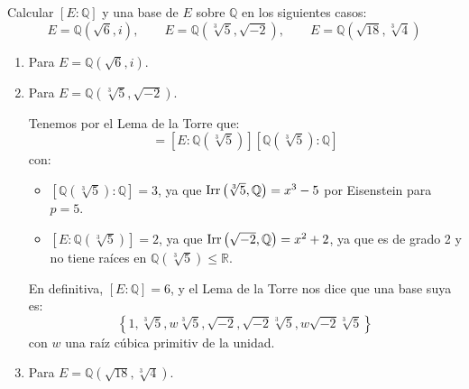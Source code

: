 \begin{ejercicio}
    Calcular $[E:\mathbb{Q}]$ y una base de $E$ sobre $\mathbb{Q}$ en los siguientes casos:
    \begin{equation*}
        E = \mathbb{Q}\left(\sqrt{6},i\right), \qquad E= \mathbb{Q}\left(\sqrt[3]{5},\sqrt{-2}\right), \qquad E = \mathbb{Q}\left(\sqrt{18},\sqrt[3]{4}\right)
    \end{equation*}
    \begin{enumerate}[label=\alph*)]
        \item Para $E = \mathbb{Q}\left(\sqrt{6},i\right)$. %
        \item Para $E= \mathbb{Q}\left(\sqrt[3]{5},\sqrt{-2}\right)$.

            Tenemos por el Lema de la Torre que:
            \begin{equation*}
                [E:\mathbb{Q}] = \left[E:\mathbb{Q}\left(\sqrt[3]{5}\right)\right]\left[\mathbb{Q}\left(\sqrt[3]{5}\right):\mathbb{Q}\right]
            \end{equation*}
            con:
            \begin{itemize}
                \item $\left[\mathbb{Q}\left(\sqrt[3]{5}\right):\mathbb{Q}\right] = 3$, ya que $\operatorname{Irr}\left(\sqrt[3]{5},\mathbb{Q}\right) = x^3-5$ por Eisenstein para $p=5$.
                \item $\left[E:\mathbb{Q}\left(\sqrt[3]{5}\right)\right] = 2$, ya que $\operatorname{Irr}\left(\sqrt{-2},\mathbb{Q}\right) = x^2+2$, ya que es de grado 2 y no tiene raíces en $\mathbb{Q}\left(\sqrt[3]{5}\right)\leq \mathbb{R}$.
            \end{itemize}
            En definitiva, $[E:\mathbb{Q}] = 6$, y el Lema de la Torre nos dice que una base suya es:
            \begin{equation*}
                \left\{1, \sqrt[3]{5}, w\sqrt[3]{5}, \sqrt{-2}, \sqrt{-2}\sqrt[3]{5}, w\sqrt{-2}\sqrt[3]{5}\right\}
            \end{equation*}
            con $w$ una raíz cúbica primitiv de la unidad.
        \item Para $E=\mathbb{Q}\left(\sqrt{18},\sqrt[3]{4}\right)$. %
    \end{enumerate}
\end{ejercicio}

